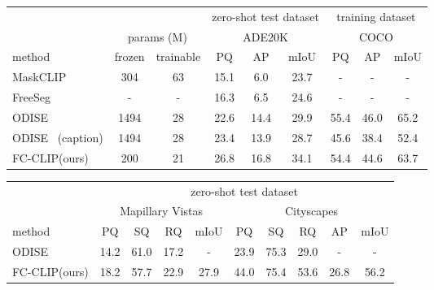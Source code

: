 \documentclass{article}
\newcommand{\modelname}{FC-CLIP\xspace}
\newcommand{\tablestyle}[2]{\setlength{\tabcolsep}{#1}\renewcommand{\arraystretch}{#2}\centering\footnotesize}
\begin{document}
\begin{table*}[!t]
\small
\centering
\tablestyle{4pt}{1.05}
\caption{
    \label{tab:panoptic_similar}
    \textbf{Open-vocabulary panoptic segmentation performance on ADE20K.}
    The proposed \modelname demonstrates better performances than prior arts, while using much fewer frozen parameters. We provide more results in the supplementary material
}
\begin{tabular}{l|cc|ccc|ccc}
& \multicolumn{2}{c|}{} & \multicolumn{3}{c|}{zero-shot test dataset}      & \multicolumn{3}{c}{training dataset}                      \\

                            & \multicolumn{2}{c|}{params (M)} & \multicolumn{3}{c|}{ADE20K}                     & \multicolumn{3}{c}{COCO}                      \\
method                      & frozen  & trainable   & PQ            & AP   & mIoU     & PQ     & AP     & mIoU          \\
\shline
MaskCLIP~\cite{ding2022open} & 304  &     63      & 15.1  & 6.0             & 23.7      & -     & -  & -           \\
FreeSeg~\cite{qin2023freeseg} & -  &     -      & 16.3   & 6.5             & 24.6         & -  & -  & -           \\
ODISE~\cite{xu2023open}   & 1494    &     28      & 22.6    & 14.4      & 29.9  & 55.4 & 46.0   & 65.2 \\
ODISE~\cite{xu2023open} (caption)   &  1494        & 28      & 23.4 & 13.9  & 28.7 & 45.6 & 38.4  & 52.4  \\ 
\hline \hline
\modelname (ours) &  200  & 21    & 26.8 & 16.8 & 34.1  & 54.4 & 44.6  & 63.7

\end{tabular}
\end{table*}

\begin{table*}[!t]
\small
\centering
\tablestyle{4pt}{1.05}
\caption{
    \label{tab:panoptic_cross}
    \textbf{Open-vocabulary panoptic segmentation performance on street-view datasets}.
    The proposed \modelname demonstrates better transferability to street-view dataset
}
\begin{tabular}{l|cccc|ccccc}
& \multicolumn{9}{c}{zero-shot test dataset}   \\

                              & \multicolumn{4}{c|}{Mapillary Vistas} & \multicolumn{5}{c}{Cityscapes}            \\
method                     & PQ          & SQ & RQ  & mIoU  & PQ          & SQ  & RQ  & AP & mIoU            \\
\shline
ODISE~\cite{xu2023open}   & 14.2 & 61.0 & 17.2 & - & 23.9 & 75.3 & 29.0  & -   & -  \\ 
\hline \hline
\modelname (ours) & 18.2 & 57.7 & 22.9 & 27.9  & 44.0 & 75.4 & 53.6   & 26.8   & 56.2 
\end{tabular}
\end{table*}
\end{document}

